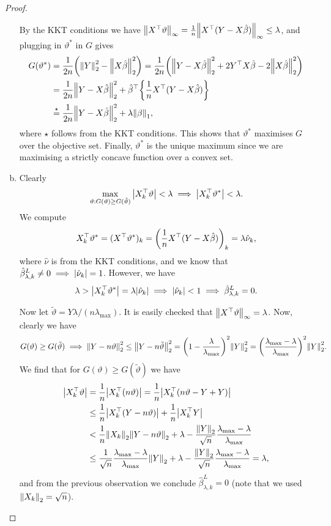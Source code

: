 \documentclass{article}
\theoremstyle{plain}
\theoremstyle{remark}
\renewcommand{\theta}{\vartheta}
\newcommand{\Rm}{\mathrm}
\newcommand{\T}{^\top} %
\begin{document}
\begin{proof}
\begin{enumerate}[(a)]
By the KKT conditions we have $\norm{X\T\theta}_\infty = \frac1n\norm{X\T(Y - X\hat\beta)}_\infty \leq \lambda$, and plugging in $\theta^*$ in $G$ gives
\begin{align*}
	G(\theta^*) &= \frac1{2n} \qty(\norm{Y}_2^2 - \norm{X\hat\beta}_2^2) = \frac1{2n} \qty(\norm{Y - X\hat\beta}_2^2 + 2 Y\T X \hat\beta - 2 \norm{X\hat\beta}_2^2) \\
	&= \frac1{2n}\norm{Y - X\hat\beta}_2^2 + \hat\beta\T \qty{\frac1n X\T(Y - X\hat\beta)} \\
	&\overset\star= \frac1{2n} \norm{Y - X\hat\beta}_2^2 + \lambda \norm{\beta}_1,
\end{align*}
where $\star$ follows from the KKT conditions. This shows that $\theta^*$ maximises $G$ over the objective set.  Finally, $\theta^*$ is the unique maximum since we are maximising a strictly concave function over a convex set. 

\item Clearly
\[
\max_{\theta : G(\theta) \geq G(\tilde\theta)} \abs{X_k\T \theta} < \lambda \implies \abs{X_k\T \theta^*} < \lambda. 
\]
We compute
\[
X_k\T \theta^* = (X\T \theta^*)_k = \qty(\frac 1n X\T (Y - X\hat\beta))_k = \lambda \hat\nu_k, 
\]
where $\hat\nu$ is from the KKT conditions, and we know that $\hat\beta_{\lambda, k}^L \neq 0 \implies \abs{\hat \nu_k} = 1$.
However, we have
\[
\lambda > \abs{X_k\T \theta^*} = \lambda \abs{\hat\nu_k} \implies \abs{\hat\nu_k} < 1 \implies \hat\beta_{\lambda, k}^L = 0. 
\]

Now let $\tilde\theta = Y\lambda/ (n\lambda_\Rm{max})$. It is easily checked that $\norm{X\T\theta}_\infty = \lambda$. Now, clearly we have 
\[
G(\theta) \geq G(\tilde\theta) \implies  \norm{Y- n\theta}_2^2 \leq \norm{Y - n \tilde\theta}_2^2 = \qty(1 - \frac\lambda{\lambda_\Rm{max}})^2 \norm{Y}_2^2 = \qty(\frac{\lambda_\Rm{max} - \lambda}{\lambda_\Rm{max}})^2 \norm{Y}_2^2.
\]
We find that for $G(\theta) \geq G(\tilde\theta)$ we have
\begin{align*}
	\abs{X_k\T\theta} &= \frac1n\abs{X_k\T (n\theta)} = \frac1n \abs{X_k\T (n\theta - Y + Y)} \\
	&\leq \frac1n \abs{X_k\T (Y - n\theta)} + \frac1n \abs{X_k\T Y} \\
	&< \frac1n \norm{X_k}_2 \norm{Y - n\theta}_2 + \lambda - \frac{\norm{Y}_2}{\sqrt n} \frac{\lambda_\Rm{max} - \lambda}{\lambda_\Rm{max}} \\
	&\leq \frac{1}{\sqrt n} \frac{\lambda_\Rm{max} - \lambda}{\lambda_\Rm{max}} \norm{Y}_2 + \lambda - \frac{\norm{Y}_2}{\sqrt n} \frac{\lambda_\Rm{max} - \lambda}{\lambda_\Rm{max}} = \lambda,
\end{align*}
and from the previous observation we conclude $\hat\beta^L_{\lambda, k} = 0$ (note that we used $\norm{X_k}_2 = \sqrt n$). 
\end{enumerate}
\end{proof}
\end{document}
